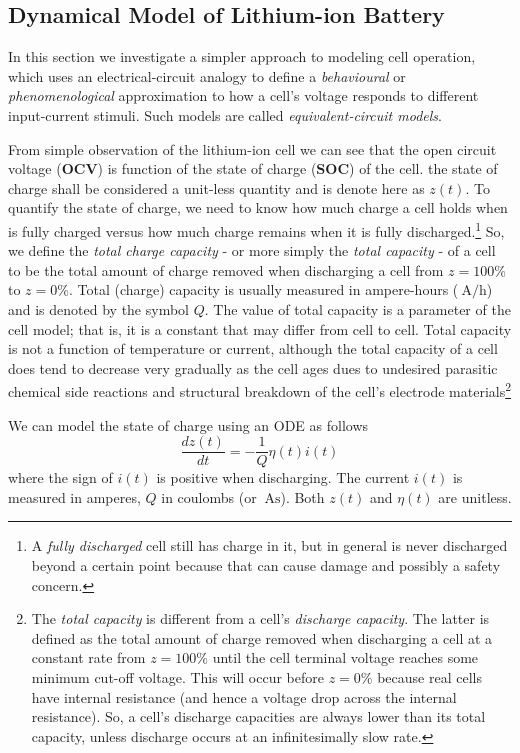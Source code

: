 \documentclass[12pt,a4paper,oneside]{book}
\begin{document}
\begin{onehalfspace}
\subsection{Dynamical Model of Lithium-ion Battery}
In this section we investigate a simpler approach to modeling cell operation, which uses an electrical-circuit analogy to define a \textit{behavioural} or \textit{phenomenological} approximation to how a cell's voltage responds to different input-current stimuli. Such models are called \textit{equivalent-circuit models}.

From simple observation of the lithium-ion cell we can see that the open circuit voltage ($\mathbf{OCV}$) is function of the state of charge ($\mathbf{SOC}$) of the cell. the state of charge shall be considered a unit-less quantity and is denote here as $z(t)$. To quantify the state of charge, we need to know how much charge a cell holds when is fully charged versus how much charge remains when it is fully discharged.\footnote{A \textit{fully discharged} cell still has charge in it, but in general is never discharged beyond a certain point because that can cause damage and possibly a safety concern.} So, we define the \textit{total charge capacity} - or more simply the \textit{total capacity} - of a cell to be the total amount of charge removed when discharging a cell from $z=100\%$ to $z=0\%$. Total (charge) capacity is usually measured in ampere-hours ($\SI{}{\ampere\per\hour}$) and is denoted by the symbol $Q$. The value of total capacity is a parameter of the cell model; that is, it is a constant that may differ from cell to cell. Total capacity is not a function of temperature or current, although the total capacity of a cell does tend to decrease very gradually as the cell ages dues to undesired parasitic chemical side reactions and structural breakdown of the cell's electrode materials\footnote{The \textit{total capacity} is different from a cell's \textit{discharge capacity}. The latter is defined as the total amount of charge removed when discharging a cell at a constant rate from $z=100\%$ until the cell terminal voltage reaches some minimum cut-off voltage. This will occur before $z=0\%$ because real cells have internal resistance (and hence a voltage drop across the internal resistance). So, a cell's discharge capacities are always lower than its total capacity, unless discharge occurs at an infinitesimally slow rate.}

We can model the state of charge using an ODE as follows
\begin{equation}
	\frac{dz(t)}{dt} = -\frac{1}{Q}\eta(t)i(t)
\end{equation}
where the sign of $i(t)$ is positive when discharging. The current $i(t)$ is measured in amperes, $Q$ in coulombs (or $\SI{}{\ampere\second}$). Both $z(t)$ and $\eta(t)$ are unitless.


\end{onehalfspace}
\end{document}
